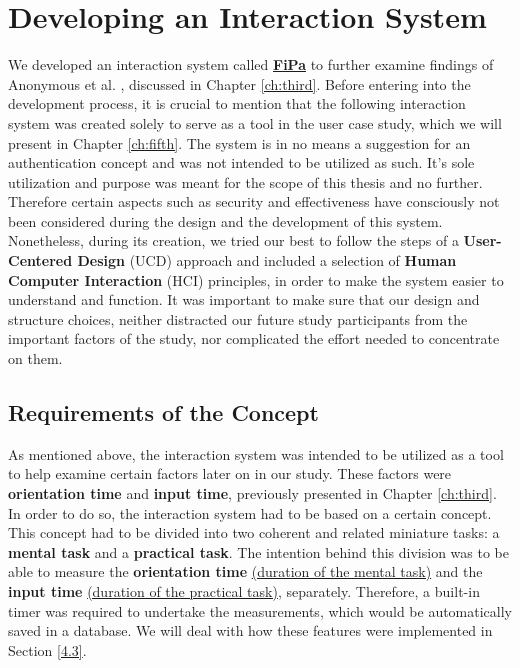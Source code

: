 
\chapter{Developing an Interaction System}\label{ch:forth}
We developed an interaction system called \underline{\textbf{FiPa}} to further examine findings of Anonymous et al. \cite{anonymous}, discussed in Chapter \ref{ch:third}. Before entering into the development process, it is crucial to mention that the following interaction system was created solely to serve as a tool in the user case study, which we will present in Chapter \ref{ch:fifth}. The system is in no means a suggestion for an authentication concept and was not intended to be utilized as such. It's sole utilization and purpose was meant for the scope of this thesis and no further. Therefore certain aspects such as security and effectiveness have consciously not been considered during the design and the development of this system. Nonetheless, during its creation, we tried our best to follow the steps of a \textbf{User-Centered Design} (UCD) approach and included a selection of \textbf{Human Computer Interaction} (HCI) principles, in order to make the system easier to understand and function. It was important to make sure that our design and structure choices, neither distracted our future study participants from the important factors of the study, nor complicated the effort needed to concentrate on them.  


\section{Requirements of the Concept} \label{4.1}
As mentioned above, the interaction system was intended to be utilized as a tool to help examine certain factors later on in our study. These factors were \textbf{orientation time} and \textbf{input time}, previously presented in Chapter \ref{ch:third}. In order to do so, the interaction system had to be based on a certain concept. This concept had to be divided into two coherent and related miniature tasks: a \textbf{mental task} and a \textbf{practical task}. The intention behind this division was to be able to measure the \textbf{orientation time} \underline{(duration of the mental task)} and the \textbf{input time} \underline{(duration of the practical task)}, separately. Therefore, a built-in timer was required to undertake the measurements, which would be automatically saved in a database. We will deal with how these features were implemented in Section \ref{4.3}. \\

